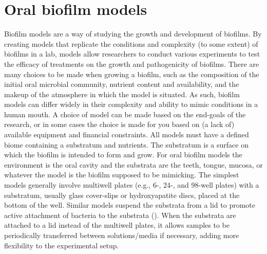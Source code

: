 \documentclass[
  b5paper,
]{book}
\begin{document}
\section{Oral biofilm models}\label{background-biofilm-models}

Biofilm models are a way of studying the growth and development of
biofilms. By creating models that replicate the conditions and
complexity (to some extent) of biofilms in a lab, models allow
researchers to conduct various experiments to test the efficacy of
treatments on the growth and pathogenicity of biofilms. There are many
choices to be made when growing a biofilm, such as the composition of
the initial oral microbial community, nutrient content and availability,
and the makeup of the atmosphere in which the model is situated. As
such, biofilm models can differ widely in their complexity and ability
to mimic conditions in a human mouth. A choice of model can be made
based on the end-goals of the research, or in some cases the choice is
made for you based on (a lack of) available equipment and financial
constraints. All models must have a defined biome containing a
substratum and nutrients. The substratum is a surface on which the
biofilm is intended to form and grow. For oral biofilm models the
environment is the oral cavity and the substrata are the teeth, tongue,
mucosa, or whatever the model is the biofilm supposed to be mimicking.
The simplest models generally involve multiwell plates (e.g., 6-, 24-,
and 98-well plates) with a substratum, usually glass cover-slips or
hydroxyapatite discs, placed at the bottom of the well. Similar models
suspend the substrata from a lid to promote active attachment of
bacteria to the substrata (). When the substrata are attached to a lid instead of the
multiwell plates, it allows samples to be periodically transferred
between solutions/media if necessary, adding more flexibility to the
experimental setup.
\end{document}
